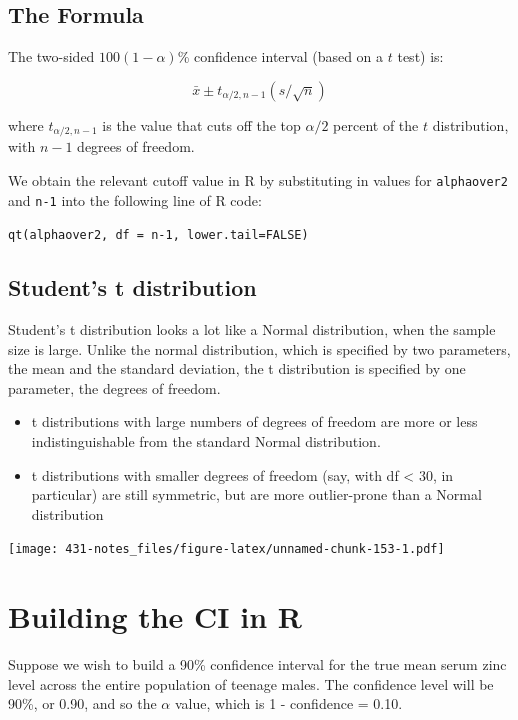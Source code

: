 \documentclass[
]{book}
\providecommand{\tightlist}{%
  \setlength{\itemsep}{0pt}\setlength{\parskip}{0pt}}
\begin{document}
\hypertarget{the-formula}{%
\subsection{The Formula}\label{the-formula}}

The two-sided \(100(1-\alpha)\)\% confidence interval (based on a \(t\) test) is:

\[\bar{x} \pm t_{\alpha/2, n-1}(s / \sqrt{n})\]

where \(t_{\alpha/2, n-1}\) is the value that cuts off the top \(\alpha/2\) percent of the \(t\) distribution, with \(n - 1\) degrees of freedom.

We obtain the relevant cutoff value in R by substituting in values for \texttt{alphaover2} and \texttt{n-1} into the following line of R code:

\texttt{qt(alphaover2,\ df\ =\ n-1,\ lower.tail=FALSE)}

\hypertarget{students-t-distribution}{%
\subsection{Student's t distribution}\label{students-t-distribution}}

Student's t distribution looks a lot like a Normal distribution, when the sample size is large. Unlike the normal distribution, which is specified by two parameters, the mean and the standard deviation, the t distribution is specified by one parameter, the degrees of freedom.

\begin{itemize}
\tightlist
\item
  t distributions with large numbers of degrees of freedom are more or less indistinguishable from the standard Normal distribution.
\item
  t distributions with smaller degrees of freedom (say, with df \textless{} 30, in particular) are still symmetric, but are more outlier-prone than a Normal distribution
\end{itemize}

\texttt{[image: 431-notes\_files/figure-latex/unnamed-chunk-153-1.pdf]}

\hypertarget{building-the-ci-in-r}{%
\section{Building the CI in R}\label{building-the-ci-in-r}}

Suppose we wish to build a 90\% confidence interval for the true mean serum zinc level across the entire population of teenage males. The confidence level will be 90\%, or 0.90, and so the \(\alpha\) value, which is 1 - confidence = 0.10.
\end{document}
